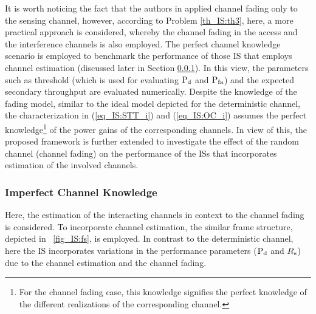 \begin{remark} \label{rem_IS:rem3}
\normalfont

It is worth noticing the fact that the authors in \cite{Juarez11} applied channel fading only to the sensing channel, however, according to Problem \ref{th_IS:th3}, here, a more practical approach is considered, whereby the channel fading in the access and the interference channels is also employed. The perfect channel knowledge scenario is employed to benchmark the performance of those IS that employs channel estimation (discussed later in Section \ref{ssec_IS:ice}). In this view, the parameters such as threshold (which is used for evaluating $\text{P}_{\text{d}}$ and $\text{P}_{\text{fa}}$) and the expected secondary throughput are evaluated numerically.
Despite the knowledge of the fading model, similar to the ideal model depicted for the deterministic channel, the characterization in (\ref{eq_IS:STT_i}) and (\ref{eq_IS:OC_i}) assumes the perfect knowledge\footnote{For the channel fading case, this knowledge signifies the perfect knowledge of the different realizations of the corresponding channel.} of the power gains of the corresponding channels. In view of this, the proposed framework is further extended to investigate the effect of the random channel (channel fading) on the performance of the ISs that incorporates estimation of the involved channels.


\end{remark}

\subsubsection{Imperfect Channel Knowledge} \label{ssec_IS:ice}
Here, the estimation of the interacting channels in context to the channel fading is considered. To incorporate channel estimation, the similar frame structure, depicted in \figurename~\ref{fig_IS:fs}, is employed. In contrast to the deterministic channel, here the IS incorporates variations in the performance parameters ($\text{P}_{\text{d}}$ and $R_{\text{s}}$) due to the channel estimation and the channel fading. 

